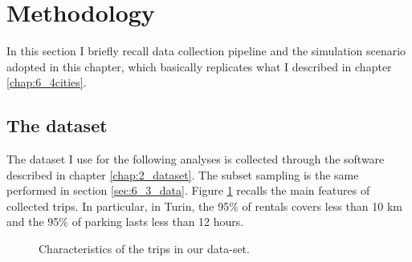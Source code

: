 \section{Methodology}
\label{sec:7_3_data}
In this section I briefly recall data collection pipeline and the simulation scenario adopted in this chapter, which basically replicates what I described in chapter \ref{chap:6_4cities}.

\subsection{The dataset}
The dataset I use for the following analyses is collected through the software described in chapter \ref{chap:2_dataset}. The subset sampling is the same performed in section \ref{sec:6_3_data}. Figure \ref{fig:7_3_ECDFs} recalls the main features of collected trips. In particular, in Turin, the 95\% of rentals covers less than 10 km and the 95\% of parking lasts less than 12 hours. 

\begin{figure}[th]
	\centering
	\caption{Characteristics of the trips in our data-set.}
	\label{fig:7_3_ECDFs}
\end{figure}



